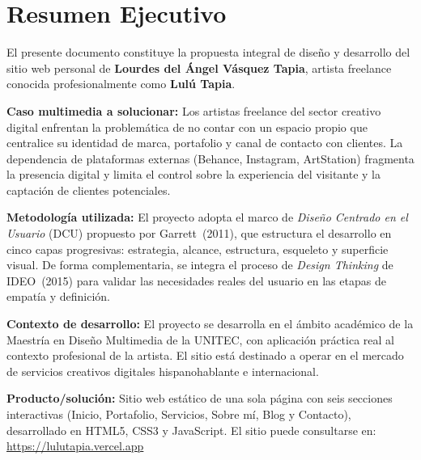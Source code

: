 \documentclass[12pt, letterpaper]{article}
\begin{document}
\pagecolor{white}
\color{black}

{
  \setlength{\parskip}{0pt}
  \tableofcontents
}
\newpage


\section*{Resumen Ejecutivo}

El presente documento constituye la propuesta integral de diseño y desarrollo del sitio web personal de \textbf{Lourdes del Ángel Vásquez Tapia}, artista freelance conocida profesionalmente como \textbf{Lulú Tapia}.

\textbf{Caso multimedia a solucionar:} Los artistas freelance del sector creativo digital enfrentan la problemática de no contar con un espacio propio que centralice su identidad de marca, portafolio y canal de contacto con clientes. La dependencia de plataformas externas (Behance, Instagram, ArtStation) fragmenta la presencia digital y limita el control sobre la experiencia del visitante y la captación de clientes potenciales.

\textbf{Metodología utilizada:} El proyecto adopta el marco de \textit{Diseño Centrado en el Usuario} (DCU) propuesto por Garrett~(2011), que estructura el desarrollo en cinco capas progresivas: estrategia, alcance, estructura, esqueleto y superficie visual. De forma complementaria, se integra el proceso de \textit{Design Thinking} de IDEO~(2015) para validar las necesidades reales del usuario en las etapas de empatía y definición.

\textbf{Contexto de desarrollo:} El proyecto se desarrolla en el ámbito académico de la Maestría en Diseño Multimedia de la UNITEC, con aplicación práctica real al contexto profesional de la artista. El sitio está destinado a operar en el mercado de servicios creativos digitales hispanohablante e internacional.

\textbf{Producto/solución:} Sitio web estático de una sola página con seis secciones interactivas (Inicio, Portafolio, Servicios, Sobre mí, Blog y Contacto), desarrollado en HTML5, CSS3 y JavaScript. El sitio puede consultarse en: \url{https://lulutapia.vercel.app}
\end{document}
